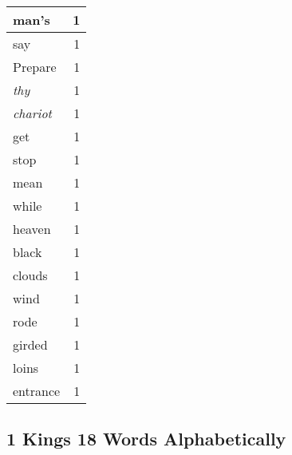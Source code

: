 \begin{center}
\begin{longtable}{l|r}
man's & 1\\ \hline 
say & 1\\ \hline 
Prepare & 1\\ \hline 
\emph{thy} & 1\\ \hline 
\emph{chariot} & 1\\ \hline 
get & 1\\ \hline 
stop & 1\\ \hline 
mean & 1\\ \hline 
while & 1\\ \hline 
heaven & 1\\ \hline 
black & 1\\ \hline 
clouds & 1\\ \hline 
wind & 1\\ \hline 
rode & 1\\ \hline 
girded & 1\\ \hline 
loins & 1\\ \hline 
entrance & 1\\ \hline 
\end{longtable}
\end{center}





\subsection{1 Kings 18 Words Alphabetically}


\normalsize
 
